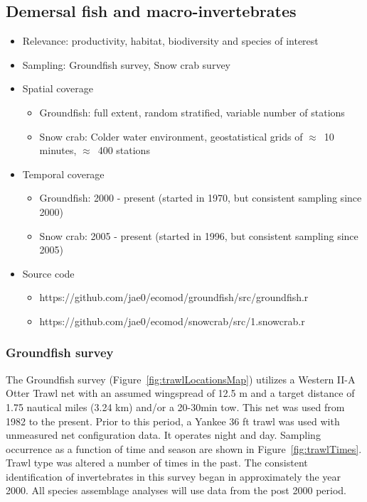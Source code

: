 \documentclass[letterpaper,portrait,11pt]{scrartcl}
\numberwithin{equation}{section}		%
\numberwithin{figure}{section}		%
\numberwithin{table}{section}				%
\begin{document}
\subsection{Demersal fish and macro-invertebrates}
\begin{itemize}
  \item Relevance:  productivity, habitat, biodiversity and species of interest
  \item Sampling:  Groundfish survey, Snow crab survey 
  \item Spatial coverage
    \begin{itemize}
      \item Groundfish: full extent, random stratified, variable number of stations
      \item Snow crab: Colder water environment, geostatistical grids of $\approx$~10 minutes, $\approx$~400 stations 
    \end{itemize}
  \item Temporal coverage
    \begin{itemize}
      \item Groundfish: 2000 - present (started in 1970, but consistent sampling since 2000)
      \item Snow crab: 2005 - present (started in 1996, but consistent sampling since 2005)
    \end{itemize}

  \item Source code
      \begin{itemize}
        \item https://github.com/jae0/ecomod/groundfish/src/groundfish.r
        \item https://github.com/jae0/ecomod/snowcrab/src/1.snowcrab.r
      \end{itemize}
  
\end{itemize}

\clearpage
\subsubsection{Groundfish survey}

The Groundfish survey (Figure~\ref{fig:trawlLocationsMap}) utilizes a Western II-A Otter Trawl net with an assumed wingspread of 12.5 m and a target distance of 1.75 nautical miles (3.24 km) and/or a 20-30min tow. This net was used from 1982 to the present. Prior to this period, a Yankee 36 ft trawl was used with unmeasured net configuration data. It operates night and day. Sampling occurrence as a function of time and season are shown in Figure~\ref{fig:trawlTimes}. Trawl type was altered a number of times in the past. The consistent identification of invertebrates in this survey began in approximately the year 2000. All species assemblage analyses will use data from the post 2000 period.
\end{document}
